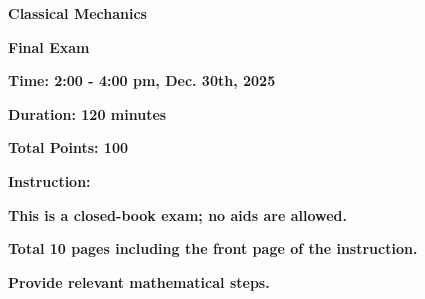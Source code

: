 \documentclass[11pt, a4paper]{article} %
\begin{document}
	
	
\setlength{\parindent}{0pt} %
\onehalfspacing				%



\vspace*{0.1cm}				%


\begin{center}
	{\Large \textbf{Classical Mechanics}}
    \vspace*{2mm}
    
    {\Large \textbf{Final Exam}}
	\vspace{8mm}

{\Large \bf \color{red} Time: 2:00 - 4:00 pm, Dec. 30th, 2025}
\vspace*{2mm}

{\Large \bf \color{red} Duration: 120 minutes}
\vspace*{2mm}

{\Large \bf \color{red} Total Points: 100}
\end{center}
\vspace*{8mm}

{\Large \bf \color{orange} Instruction:} 
\vspace*{2mm}

{\Large \bf \color{orange} \hspace{2em} This is a closed-book exam; no aids are allowed.}
\vspace*{2mm}

{\Large \bf \color{orange} \hspace{2em} Total 10 pages including the front page of the instruction.}
\vspace*{2mm}

{\Large \bf \color{orange} \hspace{2em} Provide relevant mathematical steps.} 
\vspace*{2mm}
\end{document}
